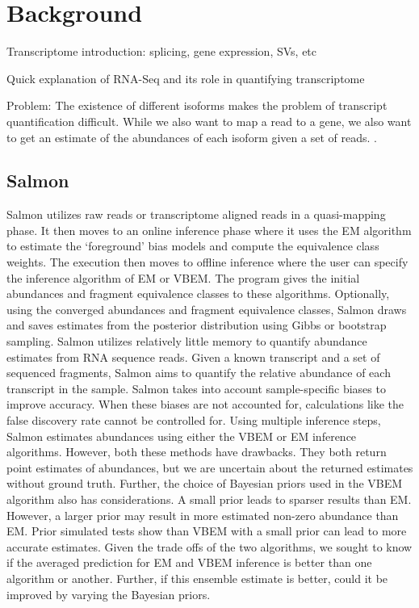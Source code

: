 \section{Background}

Transcriptome introduction: splicing, gene expression, SVs, etc

Quick explanation of RNA-Seq and its role in quantifying transcriptome

Problem:
The existence of different isoforms makes the problem of transcript quantification difficult. While we also want to map a read to a gene, we also want to get an estimate of the abundances of each isoform given a set of reads. . 


\subsection{Salmon}
Salmon utilizes raw reads or transcriptome aligned reads in a quasi-mapping phase.\cite{patro_salmon_2017} It then moves to an online inference phase where it uses the EM algorithm to estimate the ‘foreground’ bias models and compute the equivalence class weights. The execution then moves to offline inference where the user can specify the inference algorithm of EM or VBEM. The program gives the initial abundances and fragment equivalence classes to these algorithms. Optionally, using the converged abundances and fragment equivalence classes,  Salmon draws and saves estimates from the posterior distribution using Gibbs or bootstrap sampling. 
Salmon utilizes relatively little memory to quantify abundance estimates from RNA sequence reads. 
Given a known transcript and a set of sequenced fragments, Salmon aims to quantify the relative abundance of each transcript in the sample. 
Salmon takes into account sample-specific biases to improve accuracy. 
When these biases are not accounted for, calculations like the false discovery rate cannot be controlled for. 
Using multiple inference steps, Salmon estimates abundances using either the VBEM or EM inference algorithms. 
However, both these methods have drawbacks. They both return point estimates of abundances, 
but we are uncertain about the returned estimates without ground truth. Further, the choice of 
Bayesian priors used in the VBEM algorithm also has considerations. 
A small prior leads to sparser results than EM. 
However, a larger prior may result in more estimated non-zero abundance than EM. 
Prior simulated tests \cite[]{keylist} show than VBEM with a small prior can lead to more accurate estimates. 
Given the trade offs of the two algorithms, we sought to know if the averaged prediction for 
EM and VBEM inference is better than one algorithm or another. 
Further, if this ensemble estimate is better, could it be improved by varying the Bayesian priors.

